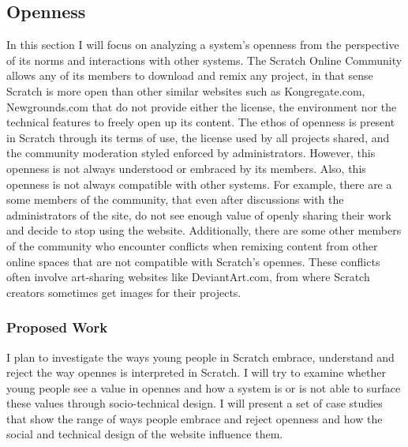 \subsection{Openness}
In this section I will focus on analyzing a system's openness from the perspective of its norms and interactions with other systems.
The Scratch Online Community allows any of its members to download and remix any project, in that sense Scratch is more open than other similar websites such as Kongregate.com, Newgrounds.com that do not provide either the license, the environment nor the technical features to freely open up its content. 
The ethos of openness is present in Scratch through its terms of use, the license used by all projects shared, and the community moderation styled enforced by administrators.
However, this openness is not always understood or embraced by its members.
Also, this openness is not always compatible with other systems.
For example, there are a some members of the community, that even after discussions with the administrators of the site, do not see enough value of openly sharing their work and decide to stop using the website. 
Additionally, there are some other members of the community who encounter conflicts when remixing content from other online spaces that are not compatible with Scratch's opennes. 
These conflicts often involve art-sharing websites like DeviantArt.com, from where Scratch creators sometimes get images for their projects.

\subsubsection{Proposed Work}
I plan to investigate the ways young people in Scratch embrace, understand and reject the way opennes is interpreted in Scratch.
I will try to examine whether young people see a value in opennes and how a system is or is not able to surface these values through socio-technical design.
I will present a set of case studies that show the range of ways people embrace and reject openness and how the social and technical design of the website influence them. 

